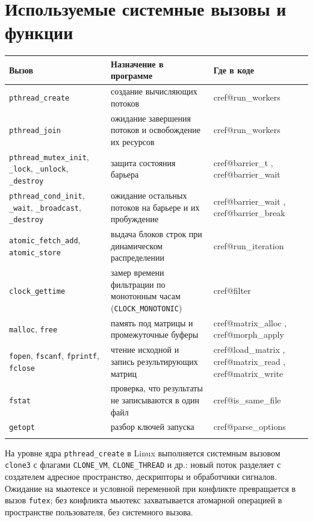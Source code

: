 \documentclass[12pt,a4paper]{article}
\makeatletter
\newcommand{\coderef}[2]{%
  \ifcsname cref@#1\endcsname
    \hyperlink{\csname cref@#1\endcsname}{\textcolor{blue}{\texttt{#2}}}%
  \else
    \errmessage{Unknown code reference: #1}%
  \fi}
\newcommand{\fn}[1]{\coderef{#1}{\detokenize{#1}}}
\makeatother
\begin{document}
\section{Используемые системные вызовы и функции}
\begin{longtable}{|>{\raggedright\arraybackslash}p{}|>{\raggedright\arraybackslash}p{}|>{\raggedright\arraybackslash}p{}|}
\hline
\rowcolor{lightgray}
\textbf{Вызов} & \textbf{Назначение в программе} & \textbf{Где в коде} \\
\hline
\endhead
\texttt{pthread\_create} & создание вычисляющих потоков & \fn{run_workers} \\
\hline
\texttt{pthread\_join} & ожидание завершения потоков и освобождение их ресурсов &
                         \fn{run_workers} \\
\hline
\texttt{pthread\_mutex\_init}, \texttt{\_lock}, \texttt{\_unlock}, \texttt{\_destroy} &
    защита состояния барьера & \fn{barrier_t}, \fn{barrier_wait} \\
\hline
\texttt{pthread\_cond\_init}, \texttt{\_wait}, \texttt{\_broadcast}, \texttt{\_destroy} &
    ожидание остальных потоков на барьере и их пробуждение &
    \fn{barrier_wait}, \fn{barrier_break} \\
\hline
\texttt{atomic\_fetch\_add}, \texttt{atomic\_store} & выдача блоков строк при
    динамическом распределении & \fn{run_iteration} \\
\hline
\texttt{clock\_gettime} & замер времени фильтрации по монотонным часам
                          (\texttt{CLOCK\_MONOTONIC}) & \fn{filter} \\
\hline
\texttt{malloc}, \texttt{free} & память под матрицы и промежуточные буферы &
                                 \fn{matrix_alloc}, \fn{morph_apply} \\
\hline
\texttt{fopen}, \texttt{fscanf}, \texttt{fprintf}, \texttt{fclose} & чтение
    исходной и запись результирующих матриц & \fn{load_matrix},
    \fn{matrix_read}, \fn{matrix_write} \\
\hline
\texttt{fstat} & проверка, что результаты не записываются в один файл &
                 \fn{is_same_file} \\
\hline
\texttt{getopt} & разбор ключей запуска & \fn{parse_options} \\*
\hline
\end{longtable}

На уровне ядра \texttt{pthread\_create} в Linux выполняется системным вызовом
\texttt{clone3} с флагами \texttt{CLONE\_VM}, \texttt{CLONE\_THREAD} и др.:
новый поток разделяет с создателем адресное пространство, дескрипторы и
обработчики сигналов. Ожидание на мьютексе и условной переменной при
конфликте превращается в вызов \texttt{futex}; без конфликта мьютекс
захватывается атомарной операцией в пространстве пользователя, без системного
вызова.
\end{document}
